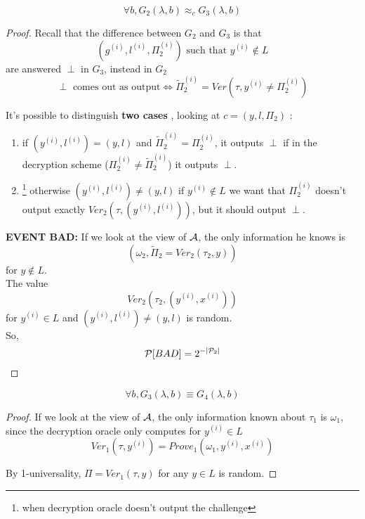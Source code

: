 \begin{lemma}
    \[
        \forall b, G_{2}(\lambda , b) \approx_{c} G_{3}(\lambda, b)
    \]
\end{lemma}
\begin{proof}
    Recall that the difference between $G_{2}$ and $G_{3}$ is that 
    \[
        (g^{(i)}, l^{(i)}, \Pi_{2}^{(i)})\text{ such that }y^{(i)}\not\in L 
    \]
    are answered $\perp$ in $G_{3}$, instead in $G_{2}$
    \[
        \perp \text{ comes out as output} \Leftrightarrow
        \tilde{\Pi}^{(i)}_{2}=Ver(\tau, y^{(i)}\not=\Pi^{(i)}_{2})
    \]

    It's possible to distinguish \textbf{two cases} , looking at $c=(y, l,
    \Pi_{2})$ :
\begin{enumerate}
    \item if $(y^{(i)}, l^{(i)})=(y,l)$ and
        $\tilde{\Pi}^{(i)}_{2}=\Pi^{(i)}_{2}$, it outputs $\perp$ if  in the
        decryption scheme ($\Pi^{(i)}_{2} \not= \tilde{\Pi}^{(i)}_{2}$) it
        outputs $\perp$.\\

    \item \footnote{when decryption oracle doesn't output the challenge}
        otherwise $(y^{(i)}, l^{(i)})\not= (y,l)$ if $y^{(i)}\not\in L$ we want
        that $\Pi^{(i)}_{2}$ doesn't output exactly $Ver_{2}(\tau, (y^{(i)},
        l^{(i)}))$, but it should output $\perp$.
\end{enumerate}

\textbf{EVENT BAD:} If we look at the view of $\A$, the only information he
knows is 
\[
    (\omega_{2}, \tilde{\Pi}_{2}=Ver_{2}(\tau_{2}, y))
\]
for $y \not\in L$.\\
The value 
\[
Ver_{2}(\tau_{2}, (y^{(i)}, x^{(i)}))
\]
for $y^{(i)} \in L$ and
$(y^{(i)}, l^{(i)})\not=(y, l)$ is random.\\
So, 
\[
\P [ BAD ] =2^{-|\P_{2}|} 
\]

\end{proof}

\begin{lemma}
    \[
        \forall b , G_{3}(\lambda, b)\equiv G_{4}(\lambda, b)   
    \]
\end{lemma}

\begin{proof}
    If we look at the view of $\A$, the only information known about $\tau_{1}$
    is $\omega_{1}$, since the decryption oracle only computes for $y^{(i)} \in
    L$
    \[
        Ver_{1}(\tau, y^{(i)})=Prove_{1}(\omega_{1}, y^{(i)}, x^{(i)})
    \]

    By 1-universality, $\Pi=Ver_{1}(\tau ,y)$ for any $y \in L$ is random.
\end{proof}

